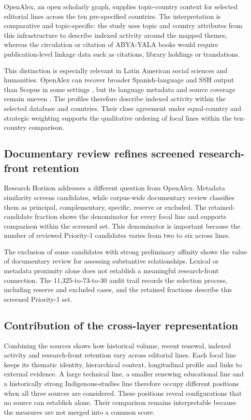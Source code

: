 \documentclass[futureinternet,article,submit,moreauthors]{Definitions/mdpi}
\newcommand{\ABYA}{ABYA-YALA\xspace}
\begin{document}
OpenAlex, an open scholarly graph, supplies topic-country context for selected editorial lines across the ten pre-specified countries. The interpretation is comparative and topic-specific: the study uses topic and country attributes from this infrastructure to describe indexed activity around the mapped themes, whereas the circulation or citation of \ABYA books would require publication-level linkage data such as citations, library holdings or translations.

This distinction is especially relevant in Latin American social sciences and humanities. OpenAlex can recover broader Spanish-language and SSH output than Scopus in some settings \citep{gallardo2024openalex}, but its language metadata and source coverage remain uneven \citep{cespedes2025linguistic,visser2021comparison}. The profiles therefore describe indexed activity within the selected database and countries. Their close agreement under equal-country and strategic weighting supports the qualitative ordering of focal lines within the ten-country comparison.

\subsection{Documentary review refines screened research-front retention}

Research Horizon addresses a different question from OpenAlex. Metadata similarity screens candidates, while corpus-wide documentary review classifies them as principal, complementary, specific, reserve or excluded. The retained-candidate fraction shows the denominator for every focal line and supports comparison within the screened set. This denominator is important because the number of reviewed Priority-1 candidates varies from two to six across lines.

The exclusion of some candidates with strong preliminary affinity shows the value of documentary review for assessing substantive relationships. Lexical or metadata proximity alone does not establish a meaningful research-front connection. The 11,325-to-73-to-30 audit trail records the selection process, including reserve and excluded cases, and the retained fractions describe this screened Priority-1 set.

\subsection{Contribution of the cross-layer representation}

Combining the sources shows how historical volume, recent renewal, indexed activity and research-front retention vary across editorial lines. Each focal line keeps its thematic identity, hierarchical context, longitudinal profile and links to external evidence. A large technical line, a smaller renewing educational line and a historically strong Indigenous-studies line therefore occupy different positions when all three sources are considered. These positions reveal configurations that no source can establish alone. Their comparison remains interpretable because the measures are not merged into a common score.
\end{document}
